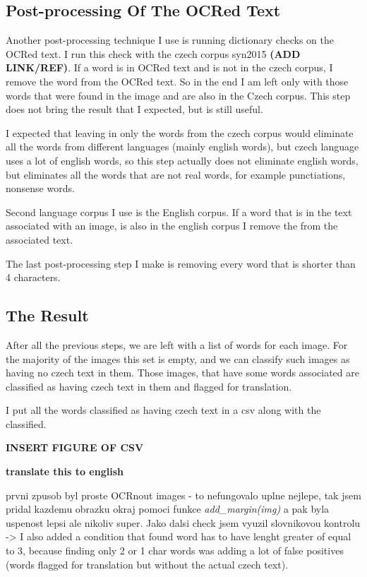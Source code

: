 \documentclass[
  digital,     %
  oneside,     %
  nosansbold,  %
  nocolorbold, %
  nolof,         %
  nolot,         %
]{fithesis4}
\begin{document}
\subsection{Post-processing Of The OCRed Text}

Another post-processing technique I use is running dictionary checks on the OCRed text. I run this check with the czech corpus syn2015 \textbf{(ADD LINK/REF)}. If a word is in OCRed text and is not in the czech corpus, I remove the word from the OCRed text. So in the end I am left only with those words that were found in the image and are also in the Czech corpus. This step does not bring the result that I expected, but is still useful.

I expected that leaving in only the words from the czech corpus would eliminate all the words from different languages (mainly english words), but czech language uses a lot of english words, so this step actually does not eliminate english words, but eliminates all the words that are not real words, for example punctiations, nonsense words.

Second language corpus I use is the English corpus. If a word that is in the text associated with an image, is also in the english corpus I remove the from the associated text.

The last post-processing step I make is removing every word that is shorter than 4 characters.

\subsection{The Result}

After all the previous steps, we are left with a list of words for each image. For the majority of the images this set is empty, and we can classify such images as having no czech text in them. Those images, that have some words associated are classified as having czech text in them and flagged for translation.

I put all the words classified as having czech text in a csv along with the classified.

\textbf{INSERT FIGURE OF CSV}

\textbf{translate this to english}

prvni zpusob byl proste OCRnout images - to nefungovalo uplne nejlepe, tak jsem pridal kazdemu obrazku okraj pomoci funkce \emph{add\_margin(img)} a pak byla uspenost lepsi ale nikoliv super. Jako dalsi check jsem vyuzil slovnikovou kontrolu -> I also added a condition that found word has to have lenght greater of equal to 3, because finding only 2 or 1 char words was adding a lot of false positives (words flagged for translation but without the actual czech text).
\end{document}
